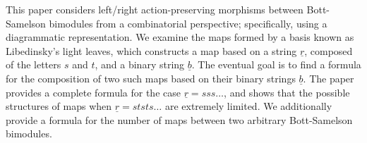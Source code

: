 
This paper considers left/right action-preserving morphisms between Bott-Samelson bimodules from a combinatorial perspective; specifically, using a diagrammatic representation.  We examine the maps formed by a basis known as Libedinsky's light leaves, which constructs a map based on a string $\underline r$, composed of the letters $s$ and $t$, and a binary string $\underline b$.  The eventual goal is to find a formula for the composition of two such maps based on their binary strings $\underline b$.  The paper provides a complete formula for the case $\underline r = sss\dots$, and shows that the possible structures of maps when $\underline r = ststs\dots$ are extremely limited.  We additionally provide a formula for the number of maps between two arbitrary Bott-Samelson bimodules.
